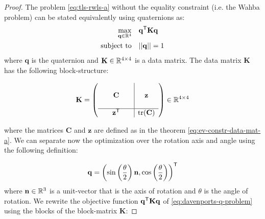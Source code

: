 \begin{proof}
	
	The problem \ref{eq:tls-rwls-a} without the equality constraint (i.e. the Wahba problem) can be stated equivalently using quaternions as:
	\begin{equation}
		\label{eq:davenports-q-problem}
		\begin{aligned}
			\max_{\mathbf{q} \in \mathbb{R}^4} &\quad \mathbf{q}^{\mathsf{T}} \mathbf{K} \mathbf{q}\\
			\text{subject to} &\quad  ||\mathbf{q}|| = 1
		\end{aligned}
	\end{equation}
	where $\mathbf{q}$ is the quaternion and $\mathbf{K} \in \mathbb{R}^{4\times4}$ is a data matrix.
	The data matrix $\mathbf{K}$ has the following block-structure:
	
	\begin{equation}
		\label{eq:k-mat}
		\begin{aligned}
			\mathbf{K} = \left(
			\begin{array}{c|c}
				\begin{array}{ccc}
					& & \\
					& \mathbf{C} & \\
					& & 
				\end{array}
				&
				\begin{array}{c}
					\mathbf{z} \\
				\end{array}
				\\
				\hline
				\begin{array}{ccc}
					& \mathbf{z}^{\mathsf{T}} &
				\end{array}
				&
				\textrm{tr}(\mathbf{C})
			\end{array}
			\right) \in \mathbb{R}^{4 \times 4}
		\end{aligned}
	\end{equation}
	
	where the matrices $\mathbf{C}$ and $\mathbf{z}$ are defined as in the theorem \ref{eq:ev-constr-data-mat-a}. 
	We can separate now the optimization over the rotation axis and angle using the following definition:
	
	\begin{equation}
		\label{eq:q-axis-angle}
		\begin{aligned}
			\mathbf{q} = \left( \sin \left( \frac{\theta}{2} \right) \mathbf{n}, \cos \left(\frac{\theta}{2} \right) \right)^{\mathsf{T}}
		\end{aligned}
	\end{equation}
	where $\mathbf{n} \in \mathbb{R}^3$ is a unit-vector that is the axis of rotation and $\theta$ is the angle of rotation.
	We rewrite the objective function $\mathbf{q}^{\mathsf{T}} \mathbf{K} \mathbf{q}$  of \ref{eq:davenports-q-problem} using the blocks of the block-matrix $\mathbf{K}$: 
	

\end{proof}
